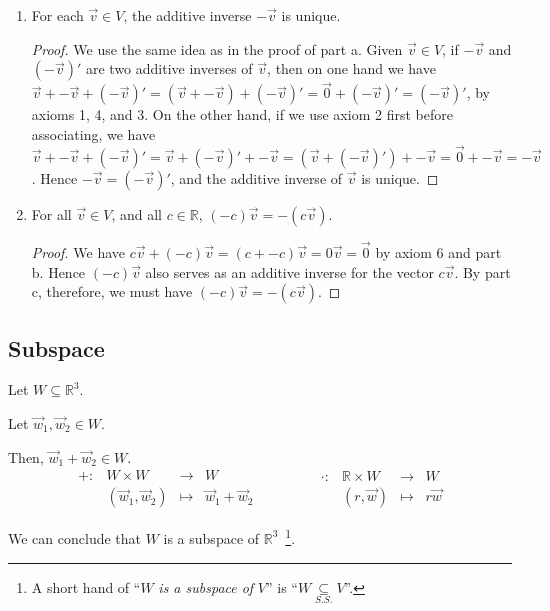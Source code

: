 \documentclass[11pt,fleqn]{book} %
\begin{document}
\begin{proposition}
\begin{enumerate}[label=\alph*)]
\begin{proof}
            Thus, $\forall \vec{v} \in V$, $\underset{\mathbb{F}}{0}\vec{v} = \vec{0}_V$. 
        \end{proof}

        \item For each $\vec{v} \in V$, the additive inverse $-\vec{v}$ is unique.

        \begin{proof}
            We use the same idea as in the proof of part a. Given $\vec{v} \in V$, if $-\vec{v}$ and $(-\vec{v})'$ are two additive inverses of $\vec{v}$, then on one hand we have $\vec{v} + -\vec{v}  + (-\vec{v})' = (\vec{v} + -\vec{v}) + (-\vec{v})' = \vec{0} + (-\vec{v})' = (-\vec{v})'$, by axioms 1, 4, and 3. On the other hand, if we use axiom 2 first before associating, we have $\vec{v} + -\vec{v}  + (-\vec{v})' = \vec{v} + (-\vec{v})' + -\vec{v} = (\vec{v} + (-\vec{v})') + -\vec{v} = \vec{0} + -\vec{v} = -\vec{v}$. Hence $-\vec{v} = (-\vec{v})'$, and the additive inverse of $\vec{v}$ is unique.
        \end{proof}
        
        \item For all $\vec{v} \in V$, and all $c \in \mathbb{R}$, $(-c)\vec{v}  = -(c\vec{v})$.
        \begin{proof}
            We have $c\vec{v} + (-c)\vec{v} = (c + -c)\vec{v} = 0\vec{v} = \vec{0}$ by axiom 6 and part b. Hence $(-c)\vec{v}$ also serves as an additive inverse for the vector $c\vec{v}$. By part c, therefore, we must have $(-c)\vec{v} = -(c\vec{v})$.
        \end{proof}
    \end{enumerate}
\end{proposition}
\setcounter{section}{3}

\subsection{Subspace}
\begin{example}
    Let $W \subseteq \mathbb{R}^3$. 
    
    Let $\vec{w}_1, \vec{w}_2 \in W$. 
    
    Then, $\vec{w}_1 + \vec{w}_2 \in W$. 
    $$
        \begin{matrix} +: &W\times W &\to &W \\ &(\vec{w}_1, \vec{w}_2) &\mapsto &\vec{w}_1 + \vec{w}_2 \end{matrix} 
        \qquad \qquad 
        \begin{matrix} \cdot: &\mathbb{R} \times W &\to &W \\ &(r, \vec{w}) &\mapsto &r\vec{w} \end{matrix}
    $$
    
    We can conclude that $W$ is a subspace of $\mathbb{R}^3$~\footnote{A short hand of ``$W$ \textit{is a subspace of} $V$'' is ``$W \underset{S.S.}{\subseteq} V$''. }. 
\end{example}
\end{document}
